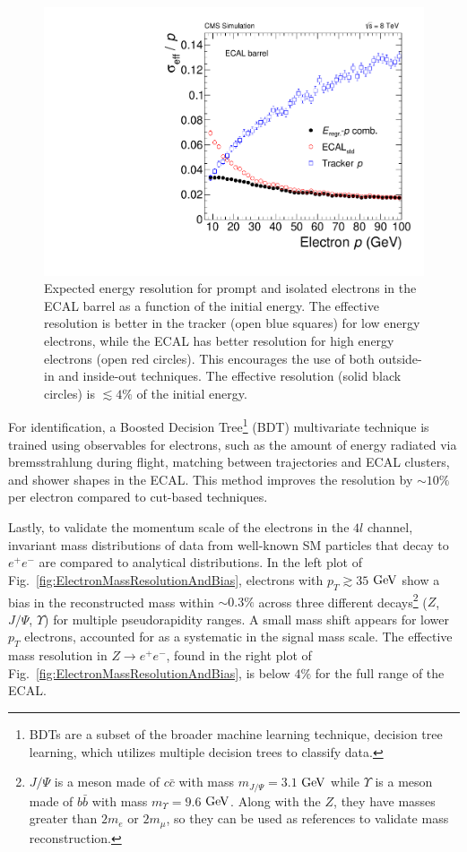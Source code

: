 \begin{figure}[htbp]
\begin{center}
\includegraphics[width=.6\linewidth]{HiggsDiscovery/figures/effRMSbarrel_withregression_new.pdf}
\caption[Expected Energy Resolution for Electrons]{Expected energy resolution for prompt and isolated electrons in the ECAL barrel as a function of the initial energy. The effective resolution is better in the tracker (open blue squares) for low energy electrons, while the ECAL has better resolution for high energy electrons (open red circles). This encourages the use of both outside-in and inside-out techniques. The effective resolution (solid black circles) is $\lesssim 4\%$ of the initial energy. }
\label{fig:ElectronEnergyResolution}
\end{center}
\end{figure}

For identification, a Boosted Decision Tree\footnote{BDTs are a subset of the broader machine learning technique, decision tree learning, which utilizes multiple decision trees to classify data.} (BDT) multivariate technique \cite{ElectronBDT:2012} is trained using observables for electrons, such as the amount of energy radiated via bremsstrahlung during flight, matching between trajectories and ECAL clusters, and shower shapes in the ECAL. This method improves the resolution by $\sim 10\%$ per electron compared to cut-based techniques.

Lastly, to validate the momentum scale of the electrons in the $4l$ channel, invariant mass distributions of data from well-known SM particles that decay to $e^+e^-$ are compared to analytical distributions. In the left plot of Fig.~\ref{fig:ElectronMassResolutionAndBias}, electrons with $p_T\gtrsim35$ $\rm{GeV}$ show a bias in the reconstructed mass within $\sim0.3\%$ across three different decays\footnote{$J/\Psi$ is a meson made of $c\bar{c}$ with mass $m_{J/\Psi}=3.1$ $\rm{GeV}$ while $\Upsilon$ is a meson made of $b\bar{b}$ with mass $m_{\Upsilon}=9.6$ $\rm{GeV}$. Along with the $Z$, they have masses greater than $2m_e$ or $2m_\mu$, so they can be used as references to validate mass reconstruction.} ($Z$, $J/\Psi$, $\Upsilon$) for multiple pseudorapidity ranges. A small mass shift appears for lower $p_T$ electrons, accounted for as a systematic in the signal mass scale. The effective mass resolution in $Z\rightarrow e^+e^-$, found in  the right plot of Fig.~\ref{fig:ElectronMassResolutionAndBias}, is below $4\%$ for the full range of the ECAL.

